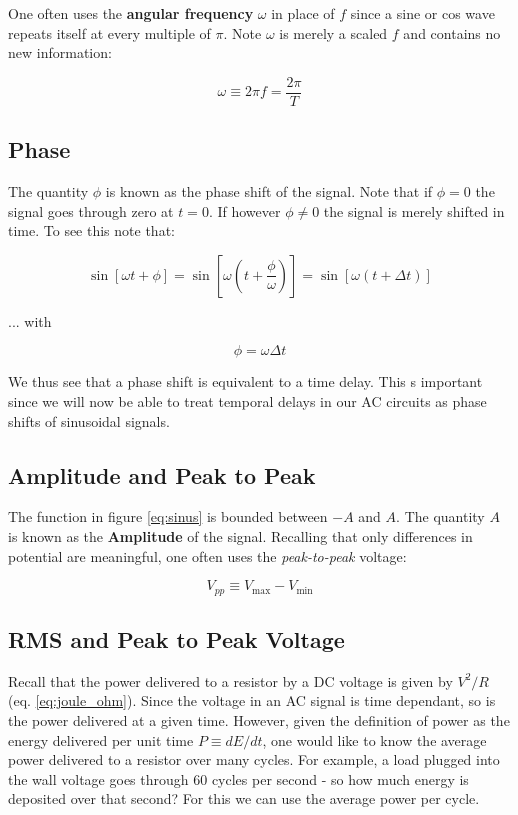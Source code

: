 \documentclass{tufte-book}
\begin{document}
One often uses the \textbf{angular frequency} $\omega$ in place of $f$ since a sine or cos wave repeats itself at every multiple of $\pi$. Note $\omega$ is merely a scaled $f$ and contains no new information:

\begin{equation}\label{def:angfreq}
\omega \equiv 2\pi f = \frac{2\pi}{T}
\end{equation}

\subsection{Phase}
The quantity $\phi$ is known as the phase shift of the signal. Note that if $\phi=0$ the signal goes through zero at $t=0$. If however $\phi\ne0$ the signal is merely shifted in time. To see this note that:

\begin{equation}\label{eq:phase_shift}
\sin\left[\omega t + \phi\right] = \sin\left[\omega\left(t  + \frac{\phi}{\omega}\right)\right] = \sin\left[\omega\left(t  + \Delta t\right)\right]
\end{equation}

\noindent ... with 

\begin{equation}\label{eq:phase_shift2}
\phi = \omega\Delta t
\end{equation}

We thus see that a phase shift is equivalent to a time delay. This s important since we will now be able to treat temporal delays in our AC circuits as phase shifts of sinusoidal signals.

\subsection{Amplitude and Peak to Peak}
The function in figure \ref{eq:sinus} is bounded between $-A$ and $A$. The quantity $A$ is known as the \textbf{Amplitude} of the signal. Recalling that only differences in potential are meaningful, one often uses the \textit{peak-to-peak} voltage:

\begin{equation}\label{def:Vpp}
V_{pp}\equiv V_\text{max} - V_\text{min}
\end{equation}

\subsection{RMS and Peak to Peak Voltage}
Recall that the power delivered to a resistor by a DC voltage is given by $V^2/R$ (eq. \ref{eq:joule_ohm}). Since the voltage in an AC signal is time dependant, so is the power delivered at a given time. However, given the definition of power as the energy delivered per unit time $P\equiv dE/dt$, one would like to know the average power delivered to a resistor over many cycles. For example, a load plugged into the wall voltage goes through 60 cycles per second - so how much energy is deposited over that second? For this we can use the average power per cycle. 
\end{document}
